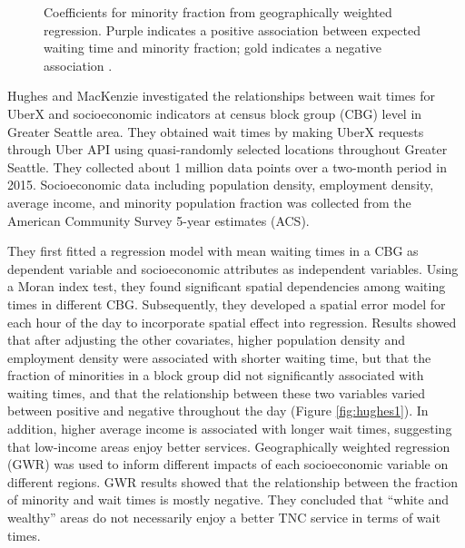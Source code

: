 \documentclass[11pt]{article}
\begin{document}
\begin{figure}[!tbp]
\begin{minipage}[b]{0.45\textwidth}
    \caption{Coefficients for minority fraction from geographically weighted regression. Purple indicates a positive association between expected waiting time and minority fraction; gold indicates a negative association \cite{hughes2016transportation}.}
    \label{fig:hughes2}
  \end{minipage}
\end{figure}
Hughes and MacKenzie \cite{hughes2016transportation} investigated the relationships between wait times for UberX and socioeconomic indicators at census block group (CBG) level in Greater Seattle area. They obtained wait times by making UberX requests through Uber API using quasi-randomly selected locations throughout Greater Seattle. They collected about 1 million data points over a two-month period in 2015. Socioeconomic data including population density, employment density, average income, and minority population fraction was collected from the American Community Survey 5-year estimates (ACS). 

They first fitted a regression model with mean waiting times in a CBG as dependent variable and socioeconomic attributes as independent variables. Using a Moran index test, they found significant spatial dependencies among waiting times in different CBG. Subsequently, they developed a spatial error model for each hour of the day to incorporate spatial effect into regression. Results showed that after adjusting the other covariates, higher population density and employment density were associated with shorter waiting time, but that the fraction of minorities in a block group did not significantly associated with waiting times, and that the relationship between these two variables varied between positive and negative throughout the day (Figure \ref{fig:hughes1}). In addition, higher average income is associated with longer wait times, suggesting that low-income areas enjoy better services. 
Geographically weighted regression (GWR) \cite{fotheringham2003geographically} was used to inform different impacts of each socioeconomic variable on different regions. GWR results showed that the relationship between the fraction of minority and wait times is mostly negative. They concluded that ``white and wealthy'' areas do not necessarily enjoy a better TNC service in terms of wait times.

\end{document}
